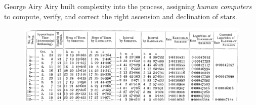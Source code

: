 \documentclass[presentation]{subfiles}
\begin{document}
\begin{frame}{George Airy}
    Airy built complexity into the process, assigning \textit{human computers} 
    to compute, verify, and correct the right ascension and declination of stars.

    \begin{figure}
    \includegraphics[width=\textwidth]{figures/complexity/pw_literature/airy.png}
    \end{figure}
\end{frame}
\end{document}
